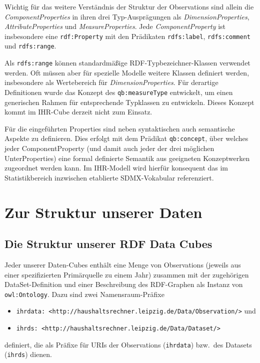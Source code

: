 \documentclass[a4paper,11pt,twoside]{article}
\begin{document}
Wichtig für das weitere Verständnis der Struktur der Observations sind allein
die \emph{ComponentProperties} in ihren drei Typ-Ausprägungen als
\emph{DimensionProperties}, \emph{AttributeProperties} und
\emph{MeasureProperties}.  Jede \emph{ComponentProperty} ist insbesondere eine
\texttt{rdf:Property} mit den Prädikaten \texttt{rdfs:label},
\texttt{rdfs:comment} und \texttt{rdfs:range}.

Als \texttt{rdfs:range} können standardmäßige RDF-Typbezeichner-Klassen
verwendet werden.  Oft müssen aber für spezielle Modelle weitere Klassen
definiert werden, insbesondere als Wertebereich für \emph{DimensionProperties}.
Für derartige Definitionen wurde das Konzept des \texttt{qb:mea\-sure\-Type}
entwickelt, um einen generischen Rahmen für entsprechende Typklassen zu
entwickeln.  Dieses Konzept kommt im IHR-Cube derzeit nicht zum Einsatz.

Für die eingeführten Properties sind neben syntaktischen auch semantische
Aspekte zu definieren. Dies erfolgt mit dem Prädikat \texttt{qb:concept}, über
welches jeder ComponentProperty (und damit auch jeder der drei möglichen
UnterProperties) eine formal definierte Semantik aus geeigneten Konzeptwerken
zugeordnet werden kann.  Im IHR-Modell wird hierfür konsequent das im
Statistikbereich inzwischen etablierte SDMX-Vokabular \cite{SDMX} referenziert.

\section{Zur Struktur unserer Daten}

\subsection{Die Struktur unserer RDF Data Cubes}

Jeder unserer Daten-Cubes enthält eine Menge von Observations (jeweils aus
einer spezifizierten Primärquelle zu einem Jahr) zusammen mit der zugehörigen
DataSet-Definition und einer Beschreibung des RDF-Graphen als Instanz von
\texttt{owl:Ontology}.  Dazu sind zwei Namensraum-Präfixe
\begin{itemize}
\item \texttt{ihrdata: <http://haushaltsrechner.leipzig.de/Data/Observation/>}
  und 
\item \texttt{ihrds: <http://haushaltsrechner.leipzig.de/Data/Dataset/>}
\end{itemize}
definiert, die als Präfixe für URIs der Observations (\texttt{ihrdata})
bzw.\ des Datasets (\texttt{ihrds}) dienen.  
\end{document}
